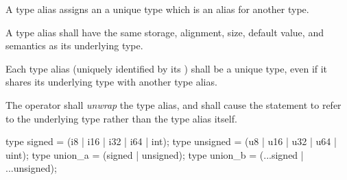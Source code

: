 \specsubsubitem
A type alias assigns an  a unique type which is an
alias for another type.


\specsubsubitem
A type alias shall have the same storage, alignment, size, default value, and
semantics as its underlying type.

\specsubsubitem
Each type alias (uniquely identified by its ) shall be
a unique type, even if it shares its underlying type with another type alias.

\specsubsubitem
The  operator shall \textit{unwrap} the type alias, and shall
cause the statement to refer to the underlying type rather than the type alias
itself.


\begin{codesample}
type signed = (i8 | i16 | i32 | i64 | int);
type unsigned = (u8 | u16 | u32 | u64 | uint);
type union_a = (signed | unsigned);
type union_b = (...signed | ...unsigned);
\end{codesample}
